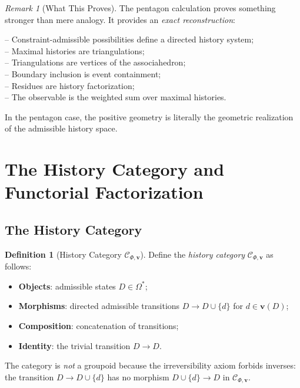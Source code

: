 \documentclass[12pt, oneside]{amsart}
\theoremstyle{plain}
\theoremstyle{definition}
\newtheorem{definition}[theorem]{Definition}
\theoremstyle{remark}
\newtheorem{remark}[theorem]{Remark}
\newcommand{\OmKS}{\Omega}
\newcommand{\Ccat}{\mathcal{C}_{\Phi,\mathbf{v}}}
\begin{document}
\begin{remark}[What This Proves]
The pentagon calculation proves something stronger than mere analogy. It provides an \emph{exact reconstruction}:

\noindent -- Constraint-admissible possibilities define a directed history system;\\
-- Maximal histories are triangulations;\\
-- Triangulations are vertices of the associahedron;\\
-- Boundary inclusion is event containment;\\
-- Residues are history factorization;\\
-- The observable is the weighted sum over maximal histories.

In the pentagon case, the positive geometry is literally the geometric realization of the admissible history space.
\end{remark}

\section{The History Category and Functorial Factorization}
\label{sec:categorical}

\subsection{The History Category}

\begin{definition}[History Category $\Ccat$]
\label{def:history-cat}
Define the \emph{history category} $\Ccat$ as follows:
\begin{itemize}[noitemsep]
  \item \textbf{Objects}: admissible states $D \in \OmKS^*$;
  \item \textbf{Morphisms}: directed admissible transitions $D \to D \cup \{d\}$ for $d \in \mathbf{v}(D)$;
  \item \textbf{Composition}: concatenation of transitions;
  \item \textbf{Identity}: the trivial transition $D \to D$.
\end{itemize}
The category is \emph{not} a groupoid because the irreversibility axiom forbids inverses: the transition $D \to D \cup \{d\}$ has no morphism $D \cup \{d\} \to D$ in $\Ccat$.
\end{definition}
\end{document}
